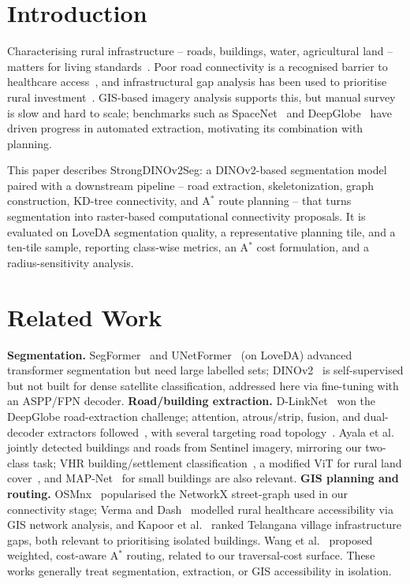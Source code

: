\documentclass[runningheads]{llncs}
\begin{document}
\section{Introduction}
Characterising rural infrastructure -- roads, buildings, water, agricultural land -- matters for living standards~\cite{hinton1996}. Poor road connectivity is a recognised barrier to healthcare access~\cite{verma2020}, and infrastructural gap analysis has been used to prioritise rural investment~\cite{kapoor2021}. GIS-based imagery analysis supports this, but manual survey is slow and hard to scale; benchmarks such as SpaceNet~\cite{vanetten2018} and DeepGlobe~\cite{demir2018} have driven progress in automated extraction, motivating its combination with planning.

This paper describes StrongDINOv2Seg: a DINOv2-based segmentation model paired with a downstream pipeline -- road extraction, skeletonization, graph construction, KD-tree connectivity, and A$^{*}$ route planning -- that turns segmentation into raster-based computational connectivity proposals. It is evaluated on LoveDA segmentation quality, a representative planning tile, and a ten-tile sample, reporting class-wise metrics, an A$^{*}$ cost formulation, and a radius-sensitivity analysis.

\section{Related Work}
\textbf{Segmentation.} SegFormer~\cite{xie2021} and UNetFormer~\cite{wang2022unet} (on LoveDA) advanced transformer segmentation but need large labelled sets; DINOv2~\cite{oquab2023} is self-supervised but not built for dense satellite classification, addressed here via fine-tuning with an ASPP/FPN decoder. \textbf{Road/building extraction.} D-LinkNet~\cite{zhou2018} won the DeepGlobe road-extraction challenge; attention, atrous/strip, fusion, and dual-decoder extractors followed~\cite{bai2025,ma2026,zhang2024,qu2025}, with several targeting road topology~\cite{kamada2021,mattyus2017,xu2023,liu2017}. Ayala et al.~\cite{ayala2021} jointly detected buildings and roads from Sentinel imagery, mirroring our two-class task; VHR building/settlement classification~\cite{dimassi2024,kakooei2026}, a modified ViT for rural land cover~\cite{wassan2025}, and MAP-Net~\cite{zhu2021} for small buildings are also relevant. \textbf{GIS planning and routing.} OSMnx~\cite{boeing2017} popularised the NetworkX street-graph used in our connectivity stage; Verma and Dash~\cite{verma2020} modelled rural healthcare accessibility via GIS network analysis, and Kapoor et al.~\cite{kapoor2021} ranked Telangana village infrastructure gaps, both relevant to prioritising isolated buildings. Wang et al.~\cite{wang2022astar} proposed weighted, cost-aware A$^{*}$ routing, related to our traversal-cost surface. These works generally treat segmentation, extraction, or GIS accessibility in isolation.
\end{document}
